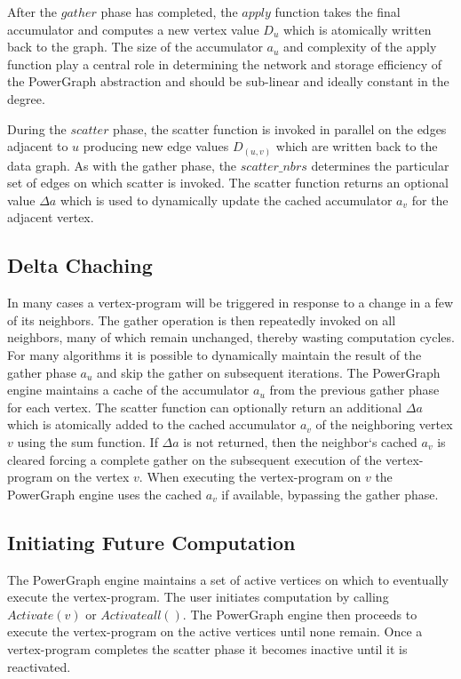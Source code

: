 \documentclass {article}
\begin{document}
After the $gather$ phase has completed, the $apply$ function takes the final
accumulator and computes a new vertex value $D_u$ which is atomically written
back to the graph. The size of the accumulator $a_u$ and complexity of the 
apply function play a central role in determining the network and storage 
efficiency of the PowerGraph abstraction and should be sub-linear and ideally
constant in the degree.


During the $scatter$ phase, the scatter function is invoked in parallel on 
the edges adjacent to $u$ producing new edge values $D_{(u,v)}$ which are 
written back to the data graph. As with the gather phase, the $scatter\_nbrs$
determines the particular set of edges on which scatter is invoked. The scatter
function returns an optional value $\Delta a$ which is used to dynamically
update the cached accumulator $a_v$ for the adjacent vertex.

\subsection{Delta Chaching}
In many cases a vertex-program will be triggered in response to a change in a
few of its neighbors. The gather operation is then repeatedly invoked on all 
neighbors, many of which remain unchanged, thereby wasting computation cycles.
For many algorithms it is possible to dynamically maintain the result of the 
gather phase $a_u$ and skip the gather on subsequent iterations. The PowerGraph
engine maintains a cache of the accumulator $a_u$ from the previous gather phase
for each vertex. The scatter function can optionally return an additional $\Delta
a$ which is atomically added to the cached accumulator $a_v$ of the neighboring 
vertex $v$ using the sum function. If $\Delta a$ is not returned, then the 
neighbor`s cached $a_v$ is cleared forcing a complete gather on the subsequent
execution of the vertex-program on the vertex $v$. When executing the vertex-program 
on $v$ the PowerGraph engine uses the cached $a_v$ if available, bypassing the 
gather phase.


\subsection{Initiating Future Computation}
The PowerGraph engine maintains a set of active vertices
on which to eventually execute the vertex-program. The
user initiates computation by calling $Activate(v)$ or
$Activateall()$. The PowerGraph engine then proceeds to
execute the vertex-program on the active vertices until
none remain. Once a vertex-program completes the scatter
phase it becomes inactive until it is reactivated.
\end{document}
